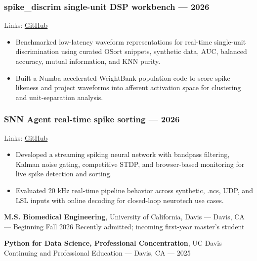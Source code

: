 \documentclass[11pt]{article}
\providecommand{\tightlist}{\setlength{\itemsep}{0pt}\setlength{\parskip}{0pt}}
\renewcommand{\subsection}[1]{\par\medskip\noindent{\sffamily\bfseries\fontsize{11pt}{0}\selectfont #1}\par\smallskip}
\begin{document}
\subsubsection{spike\_discrim single-unit DSP workbench ---
2026}\label{spike_discrim-single-unit-dsp-workbench-2026}

Links:
\href{https://github.com/BarkBarkBarkBarkBarkBarkBark/spike_discrim}{GitHub}

\begin{itemize}
\tightlist
\item
  Benchmarked low-latency waveform representations for real-time
  single-unit discrimination using curated OSort snippets, synthetic
  data, AUC, balanced accuracy, mutual information, and KNN purity.
\item
  Built a Numba-accelerated WeightBank population code to score
  spike-likeness and project waveforms into afferent activation space
  for clustering and unit-separation analysis.
\end{itemize}

\subsubsection{SNN Agent real-time spike sorting ---
2026}\label{snn-agent-real-time-spike-sorting-2026}

Links:
\href{https://github.com/BarkBarkBarkBarkBarkBarkBark/SNNeuro}{GitHub}

\begin{itemize}
\tightlist
\item
  Developed a streaming spiking neural network with bandpass filtering,
  Kalman noise gating, competitive STDP, and browser-based monitoring
  for live spike detection and sorting.
\item
  Evaluated 20 kHz real-time pipeline behavior across synthetic, .ncs,
  UDP, and LSL inputs with online decoding for closed-loop neurotech use
  cases.
\end{itemize}

\subsection{Education}\label{education}

\textbf{M.S. Biomedical Engineering}, University of California, Davis
--- Davis, CA --- Beginning Fall 2026 Recently admitted; incoming
first-year master's student

\textbf{Python for Data Science, Professional Concentration}, UC Davis
Continuing and Professional Education --- Davis, CA --- 2025
\end{document}
